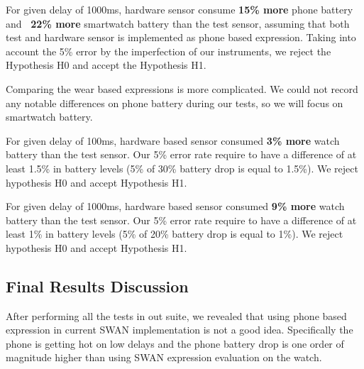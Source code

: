For given delay of 1000ms, hardware sensor consume \textbf{15\% more} phone battery and \textbf{~22\% more } smartwatch battery than the test sensor, assuming that both test and hardware
sensor is implemented as phone based expression.
Taking into account the 5\% error by the imperfection of our instruments, we reject the Hypothesis H0 and accept the Hypothesis H1.

Comparing the wear based expressions is more complicated. We could not record any notable differences on phone battery during our tests, so we will focus on smartwatch battery.

For given delay of 100ms,  hardware based sensor consumed \textbf{3\% more} watch battery than the test sensor.
Our 5\% error rate require to have a difference of at least 1.5\% in battery levels (5\% of 30\% battery drop is equal to 1.5\%). We
reject hypothesis H0 and accept Hypothesis H1.

For given delay of 1000ms,  hardware based sensor consumed \textbf{9\% more} watch battery than the test sensor.
Our 5\% error rate require to have a difference of at least 1\% in battery levels (5\% of 20\% battery drop is equal to 1\%). We
reject hypothesis H0 and accept Hypothesis H1.

\subsection{Final Results Discussion}

After performing all the tests in out suite, we revealed that using phone based expression in current SWAN implementation is not a good idea.
Specifically the phone is getting hot on low delays and the phone battery drop is one order of magnitude higher than using SWAN expression evaluation on the watch.

